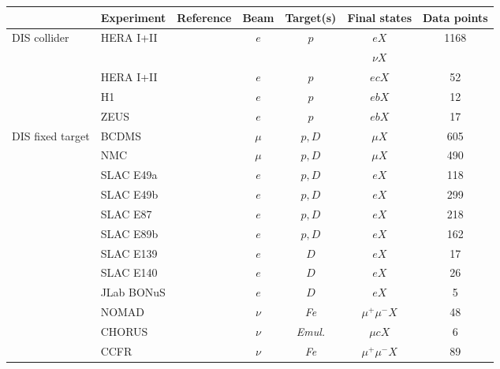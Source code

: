 \documentclass[%
      aps,
      prd,
      floatfix,
      preprintnumbers,
      preprint,
      showpacs,
      nofootinbib,
      tightenlines,
      amssymb,
      amsmath
]{revtex4-1}
\begin{document}
\begin{table}[ht] 
\begin{center}
\begin{tabular}{l|l|c|c|c|c|c} \hline 
            & Experiment & Reference & Beam & Target(s) & Final states & Data points \\ 
\hline\hline
DIS collider      &  HERA I+II & \cite{Abramowicz:2015mha}  & $e$ & $p$ & $e X$ & 1168 \\  
                  &                  &     &  &  & $\nu X$ &  \\  
                  &  HERA I+II  & \cite{Abramowicz:1900rp}  & $e$ & $p$ & $e c X$ & 52 \\   
                  &  H1  & \cite{Aaron:2009af}  & $e$ & $p$ & $e b X$ & 12 \\   
                  &  ZEUS  & \cite{Abramowicz:2014zub}  & $e$ & $p$ & $e b X$ & 17 \\ \hline  
DIS fixed target  & BCDMS & \cite{Benvenuti:1989rh,Benvenuti:1989fm} & $\mu$ & $p,D$ & $\mu X$ & 605 \\  
                  & NMC & \cite{Arneodo:1996qe} & $\mu$ & $p,D$ & $\mu X$ & 490 \\  
                  & SLAC E49a & \cite{Bodek:1979rx} & $e$ & $p,D$ & $e X$ & 118 \\  
                  & SLAC E49b & \cite{Bodek:1979rx} & $e$ & $p,D$ & $e X$ & 299 \\  
                  & SLAC E87 & \cite{Bodek:1979rx} & $e$ & $p,D$ & $e X$ & 218 \\  
                  & SLAC E89b & \cite{Mestayer:1982ba} & $e$ & $p,D$ & $e X$ & 162 \\  
                  & SLAC E139 & \cite{Gomez:1993ri} & $e$ & $D$ & $e X$ & 17 \\  
                  & SLAC E140 & \cite{Dasu:1993vk} & $e$ & $D$ & $e X$ & 26 \\  
                  & JLab BONuS & \cite{Griffioen:2015hxa} &  $e$ & $D$ & $eX$ & 5 \\ 
                  & NOMAD & \cite{Samoylov:2013xoa} & $\nu$ & {\it Fe} & $\mu^+ \mu^- X$ & 48 \\ 
                  & CHORUS & \cite{KayisTopaksu:2011mx} & $\nu$ & {\it Emul.} & $\mu c X$ & 6 \\   
                  & CCFR & \cite{Goncharov:2001qe} & $\nu$ & {\it Fe} & $\mu^+ \mu^- X$ & 89 \\ 

\end{tabular}
\end{center}
\end{table}
\end{document}
